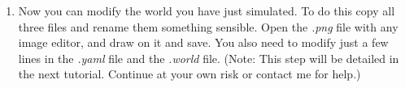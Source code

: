 \documentclass[12pt]{article}
\begin{document}
\begin{enumerate}
    \item Now you can modify the world you have just simulated. To do this copy all three files and rename them something sensible. Open the {\it .png} file with any image editor, and draw on it and save. You also need to modify just a few lines in the {\it .yaml} file and the {\it .world} file. (Note: This step will be detailed in the next tutorial. Continue at your own risk or contact me for help.)
    
    
\end{enumerate}
\end{document}
